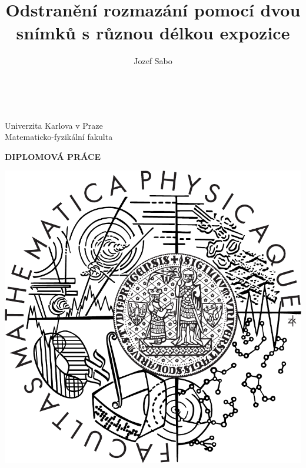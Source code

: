 \documentclass[12pt,notitlepage]{report}
\title{Odstranění rozmazání pomocí dvou snímků s různou délkou expozice}   %
\author{Jozef Sabo} %
\begin{document}

 \pagestyle{empty}
\begin{titlepage}
\begin{center}
\ \\

\vspace{15mm}

\large
Univerzita Karlova v Praze\\
Matematicko-fyzikální fakulta\\

\vspace{5mm}

{\Large\bf DIPLOMOVÁ PRÁCE}

\vspace{10mm}

\includegraphics[scale=0.3]{mff_logo.pdf}


\end{center}
\end{titlepage}
\end{document}

